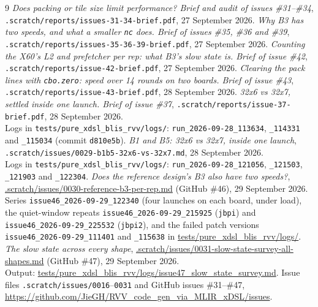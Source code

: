 \documentclass[11pt,a4paper]{article}
\begin{document}
\begin{thebibliography}{9}
 \emph{Does packing or tile size limit performance? Brief and audit of issues \#31--\#34},
\texttt{.scratch/reports/issues-31-34-brief.pdf}, 27 September 2026.
 \emph{Why B3 has two speeds, and what a smaller \texttt{nc} does. Brief of issues \#35, \#36 and
\#39}, \texttt{.scratch/reports/issues-35-36-39-brief.pdf}, 27 September 2026.
 \emph{Counting the X60's L2 and prefetcher per rep: what B3's slow state is. Brief of issue \#42},
\texttt{.scratch/reports/issue-42-brief.pdf}, 27 September 2026.
 \emph{Clearing the pack lines with \texttt{cbo.zero}: speed over 14 rounds on two boards. Brief of
issue \#43}, \texttt{.scratch/reports/issue-43-brief.pdf}, 28 September 2026.
 \emph{32x6 vs 32x7, settled inside one launch. Brief of issue \#37},
\texttt{.scratch/reports/issue-37-brief.pdf}, 28 September 2026.\\
Logs in \texttt{tests/pure\_xdsl\_blis\_rvv/logs/}: \texttt{run\_2026-09-28\_113634}, \texttt{\_114331} and
\texttt{\_115034} (commit \texttt{d810e5b}).
 \emph{B1 and B5: 32x6 vs 32x7, inside one launch}, \texttt{.scratch/issues/0029-b1b5-32x6-vs-32x7.md},
28 September 2026.\\ Logs in \texttt{tests/pure\_xdsl\_blis\_rvv/logs/}: \texttt{run\_2026-09-28\_121056}, \texttt{\_121503},
\texttt{\_121903} and \texttt{\_122304}.
 \emph{Does the reference design's B3 also have two speeds?}, \url{.scratch/issues/0030-reference-b3-per-rep.md}
(GitHub \#46), 29 September 2026.\\ Series \texttt{issue46\_2026-09-29\_122340} (four launches on each board, under load), the quiet-window repeats
\texttt{issue46\_2026-09-29\_215925} (\texttt{jbpi}) and \texttt{issue46\_2026-09-29\_225532} (\texttt{jbpi2}), and the failed
patch versions \texttt{issue46\_2026-09-29\_111401} and \texttt{\_115638} in \url{tests/pure_xdsl_blis_rvv/logs/}.
 \emph{The slow state across every shape}, \url{.scratch/issues/0031-slow-state-survey-all-shapes.md} (GitHub \#47),
29 September 2026.\\ Output: \url{tests/pure_xdsl_blis_rvv/logs/issue47_slow_state_survey.md}.
 Issue files \texttt{.scratch/issues/0016}--\texttt{0031} and GitHub issues \#31--\#47,
\url{https://github.com/JieGH/RVV_code_gen_via_MLIR_xDSL/issues}.
\end{thebibliography}
\end{document}
